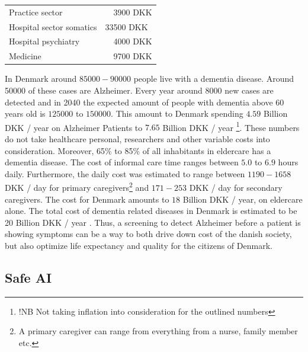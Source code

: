 \documentclass[12pt, fleqn, titlepage]{article}
\newcommand{\1}[1]{\mathds{1}\left[#1\right]}
\begin{document}
		\begin{table}[H]
			\begin{tabular}{ll}
				Practice sector   &\ \ 3900  DKK  \\
				Hospital sector somatics  & 33500 DKK \\
				Hospital psychiatry  &  \ \ 4000  DKK  \\
				Medicine & \ \ 9700  DKK 
			\end{tabular}
		\end{table}
		
		In Denmark around $ 85000-90000 $ people live with a dementia disease. Around 50000 of these cases are Alzheimer. Every year around $ 8000 $ new cases are detected and in 2040 the expected amount of people with dementia above 60 years old is $ 125000 $ to $ 150000 $. This amount to Denmark spending $ 4.59 $ Billion DKK / year on Alzheimer Patients to $ 7.65 $ Billion DKK / year \footnote{!NB Not taking inflation into consideration for the outlined numbers}. These numbers do not take healthcare personal, researchers and other variable costs into consideration. Moreover, 65\% to 85\% of all inhabitants in eldercare has a dementia disease. The cost of informal care time ranges between $ 5.0 $ to $ 6.9 $ hours daily. Furthermore, the daily cost was estimated to range between $ 1190 - 1658 $ DKK / day for primary caregivers\footnote{A primary caregiver can range from everything from a nurse, family member etc.} and $ 171 - 253 $ DKK / day for secondary caregivers. The cost for Denmark amounts to $ 18 $ Billion DKK / year, on eldercare alone. The total cost of dementia related diseases in Denmark is estimated to be 20 Billion DKK / year \cite{Alzheimerforeningen} \cite{informal_care}. Thus, a screening to detect Alzheimer before a patient is showing symptoms can be a way to both drive down cost of the danish society, but also optimize life expectancy and quality for the citizens of Denmark.
		

\subsection{Safe AI}
\end{document}
